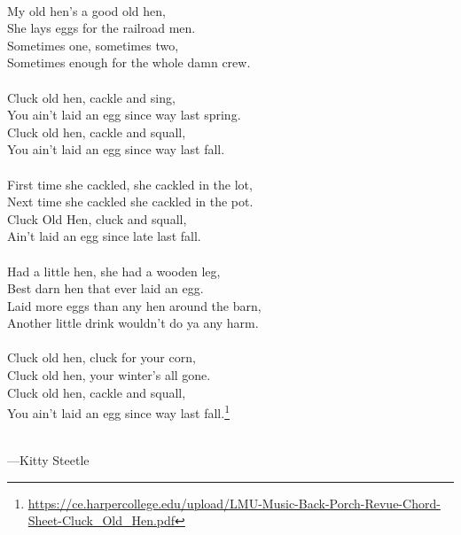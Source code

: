 \documentclass[12pt]{article}
\begin{document}
{\begin{minipage}{7.0in}
 {\parindent0pt
      \raggedright
      ~\\
My old hen's a good old hen, \\
She lays eggs for the railroad men. \\
Sometimes one, sometimes two, \\
Sometimes enough for the whole damn crew. \\
      ~\\
Cluck old hen, cackle and sing, \\
You ain't laid an egg since way last spring. \\
Cluck old hen, cackle and squall, \\
You ain't laid an egg since way last fall. \\
      ~\\
First time she cackled, she cackled in the lot, \\
Next time she cackled she cackled in the pot. \\
Cluck Old Hen, cluck and squall, \\
Ain't laid an egg since late last fall. \\
      ~\\
Had a little hen, she had a wooden leg, \\
Best darn hen that ever laid an egg. \\
Laid more eggs than any hen around the barn, \\
Another little drink wouldn't do ya any harm. \\
      ~\\ 
Cluck old hen, cluck for your corn, \\
Cluck old hen, your winter's all gone. \\
Cluck old hen, cackle and squall, \\
You ain't laid an egg since way last fall.\footnote{\url{https://ce.harpercollege.edu/upload/LMU-Music-Back-Porch-Revue-Chord-Sheet-Cluck_Old_Hen.pdf}} \\
      ~\\
    }

    ---Kitty Steetle    
    
    
  \end{minipage}
}
\end{document}
